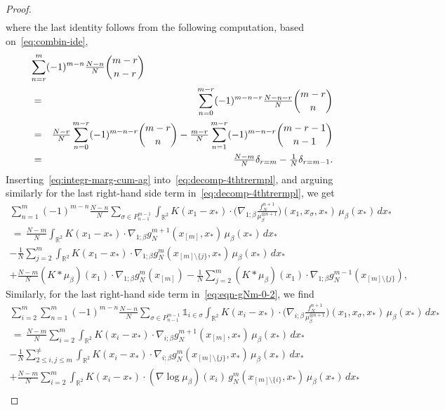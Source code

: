 \documentclass[a4paper,11pt,reqno,noindent]{amsart}
\theoremstyle{plain}
\numberwithin{equation}{section}
\newcommand{\R}{\mathbb R}
\newcommand{\3}{|\!|\!|}
\begin{document}
\begin{proof}
\begin{eqnarray}
\label{eq:integr-marg-cum-ag}
\end{eqnarray}
where the last identity follows from the following computation, based on~\eqref{eq:combin-ide},
\begin{eqnarray*}
\lefteqn{\sum_{n=r}^m(-1)^{m-n}\tfrac{N-n}N\binom{m-r}{n-r}}\\
&=&\sum_{n=0}^{m-r}(-1)^{m-n-r}\tfrac{N-n-r}N\binom{m-r}{n}\\
&=&\tfrac{N-r}N\sum_{n=0}^{m-r}(-1)^{m-n-r}\binom{m-r}{n}-\tfrac{m-r}N\sum_{n=1}^{m-r}(-1)^{m-n-r}\binom{m-r-1}{n-1}\\
&=&\tfrac{N-m}N\delta_{r=m}-\tfrac{1}N\delta_{r=m-1}.
\end{eqnarray*}
Inserting~\eqref{eq:integr-marg-cum-ag} into~\eqref{eq:decomp-4thtrermpl}, and arguing similarly for the last right-hand side term in~\eqref{eq:decomp-4thtrermpl}, we get
\begin{multline*}
\sum_{n=1}^m(-1)^{m-n}\tfrac{N-n}N\sum_{\sigma\in P_{n-1}^{m-1}}\int_{\R^2}K(x_1-x_*)\cdot\Big(\nabla_{1;\beta}\tfrac{f_N^{n+1}}{\mu_\beta^{\otimes n+1}}\Big)(x_1,x_\sigma,x_*)\,\mu_\beta(x_*)\,dx_*\\
\,=\,\tfrac{N-m}N\int_{\R^2}K(x_1-x_*)\cdot\nabla_{1;\beta}g_N^{m+1}(x_{[m]},x_*)\,\mu_\beta(x_*)\,dx_*\\
-\tfrac{1}N\sum_{j=2}^m\int_{\R^2}K(x_1-x_*)\cdot\nabla_{1;\beta}g_N^{m}(x_{[m]\setminus\{j\}},x_*)\,\mu_\beta(x_*)\,dx_*\\
+\tfrac{N-m}N(K\ast\mu_\beta)(x_1)\cdot\nabla_{1;\beta}g_N^{m}(x_{[m]})
-\tfrac{1}N\sum_{j=2}^m(K\ast\mu_\beta)(x_1)\cdot\nabla_{1;\beta}g_N^{m-1}(x_{[m]\setminus\{j\}}),
\end{multline*}
Similarly, for the last right-hand side term in~\eqref{eq:eqn-gNm-0-2}, we find
\begin{multline*}
{\sum_{i=2}^m\sum_{n=1}^m(-1)^{m-n}\tfrac{N-n}N\sum_{\sigma\in P_{n-1}^{m-1}}\mathds1_{i\in\sigma}\int_{\R^2} K(x_i-x_*)\cdot\Big(\nabla_{i;\beta}\tfrac{f_N^{n+1}}{\mu_\beta^{\otimes n+1}}\Big)(x_1,x_\sigma,x_*)\,\mu_\beta(x_*)\,dx_*}\\
\,=\,\tfrac{N-m}N\sum_{i=2}^m\int_{\R^2} K(x_i-x_*)\cdot \nabla_{i;\beta}g_N^{m+1}(x_{[m]},x_*)\,\mu_\beta(x_*)\,dx_*\\
-\tfrac1N\sum_{2\le i,j\le m}^{\ne}\int_{\R^2} K(x_i-x_*)\cdot \nabla_{i;\beta}g_N^{m}(x_{[m]\setminus\{j\}},x_*)\,\mu_\beta(x_*)\,dx_*\\
+\tfrac{N-m}N\sum_{i=2}^m\int_{\R^2} K(x_i-x_*)\cdot (\nabla\log\mu_\beta)(x_i)\,g_N^{m}(x_{[m]\setminus\{i\}},x_*)\,\mu_\beta(x_*)\,dx_*\\

\end{multline*}
\end{proof}
\end{document}
